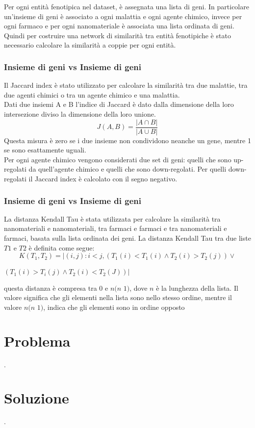 \documentclass{beamer}
\begin{document}
\begin{frame}
Per ogni entità fenotipica nel dataset, è assegnata una lista di geni. In particolare un'insieme di geni è associato a ogni malattia e ogni agente chimico, invece per ogni farmaco e per ogni nanomateriale è associata una lista ordinata di geni. \\
\medskip
Quindi per costruire una network di similarità tra entità fenotipiche è stato necessario calcolare la similarità a coppie per ogni entità.
\end{frame}

\begin{frame}
\frametitle{Insieme di geni vs Insieme di geni}
Il Jaccard index è stato utilizzato per calcolare la similarità tra due malattie, tra due agenti chimici o tra un agente chimico e una malattia.\\
Dati due insiemi A e B l'indice di Jaccard è dato dalla dimensione della loro intersezione diviso la dimensione della loro unione.
\begin{equation}
J(A, B) = \frac{|A \cap B|}{|A \cup  B|}
\end{equation}
Questa misura è zero se i due insieme non condividono neanche un gene, mentre 1 se sono esattamente uguali.\\
Per ogni agente chimico vengono considerati due set di geni: quelli che sono up-regolati da quell'agente chimico e quelli che sono down-regolati.
Per quelli down-regolati il Jaccard index è calcolato con il segno negativo.
\end{frame}


\begin{frame}
\frametitle{Insieme di geni vs Insieme di geni}
La distanza Kendall Tau è stata utilizzata per calcolare la similarità tra nanomateriali e nanomateriali, tra farmaci e farmaci e tra nanomateriali e farmaci, basata sulla lista ordinata dei geni.
La distanza Kendall Tau tra due liste $T1$ e $T2$ è definita come segue:
\begin{equation}
K(T_1, T_2) = |(i, j): i < j, (T_1(i) < T_1(i) \wedge  T_2(i) > T_2(j)) \vee
\end{equation}
\begin{center}$
 (T_1(i) > T_i(j) \wedge T_2(i) < T_2(J))  |
$
\end{center}
questa distanza è compresa tra 0 e $n(n$ $1)$, dove $n$ è la lunghezza della lista. Il valore significa che gli elementi nella lista sono nello stesso ordine, mentre il valore $n(n$ $1)$, indica che gli elementi sono in ordine opposto
\end{frame}


\section{Problema}
\begin{frame}
.
\end{frame}

\section{Soluzione}
\begin{frame}
.
\end{frame}
\end{document}
